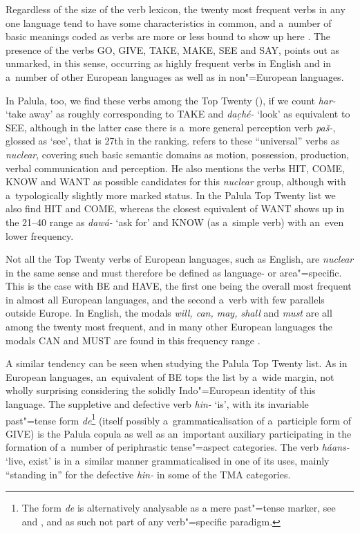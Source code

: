 Regardless of the size of the verb lexicon, the twenty most frequent verbs in any one language tend to have some characteristics in common, and a~number of basic meanings coded as verbs are more or less bound to show up here \citep[209]{viberg2006}. The presence of the verbs GO, GIVE, TAKE, MAKE, SEE and SAY, \citet[247]{viberg1993} points out as unmarked, in this sense, occurring as highly frequent verbs in English and in a~number of other European languages as well as in non"=European languages. 



In Palula, too, we find these verbs among the Top Twenty (), if we count \textit{har-} `take away' as roughly corresponding to TAKE and \textit{dac̣hé-} `look' as equivalent to SEE, although in the latter case there is a~more general perception verb \textit{paš-}, glossed as `see', that is 27th in the ranking. \citet[409]{viberg2006} refers to these ``universal'' verbs as \textit{nuclear}, covering such basic semantic domains as motion, possession, production, verbal communication and perception. He also mentions the verbs HIT, COME, KNOW and WANT as possible candidates for this \textit{nuclear} group, although with a~typologically slightly more marked status. In the Palula Top Twenty list we also find HIT and COME, whereas the closest equivalent of WANT shows up in the 21--40 range as \textit{dawá-} `ask for' and KNOW (as a~simple verb) with an~even lower frequency.



Not all the Top Twenty verbs of European languages, such as English, are \textit{nuclear} in the same sense and must therefore be defined as language- or area"=specific. This is the case with BE and HAVE, the first one being the overall most frequent in almost all European languages, and the second a~verb with few parallels outside Europe. In English, the modals \textit{will, can, may, shall} and \textit{must} are all among the twenty most frequent, and in many other European languages the modals CAN and MUST are found in this frequency range \citep[346--349]{viberg1993}. 



A similar tendency can be seen when studying the Palula Top Twenty list. As in European languages,
an~equivalent of BE tops the list by a~wide margin, not wholly surprising considering the solidly
Indo"=European identity of this language. The suppletive and defective verb \textit{hin-} `is', with its invariable past"=tense form \textit{de}\footnote{The form \textit{de} is alternatively analysable as a mere past"=tense marker, see  and , and as such not part of any verb"=specific paradigm.} (itself possibly a~grammaticalisation of a~participle form of GIVE) is the Palula copula as well as an~important auxiliary participating in the formation of a~number of periphrastic tense"=aspect categories. The verb \textit{háans-} `live, exist' is in a~similar manner grammaticalised in one of its uses, mainly ``standing in'' for the defective \textit{hin-} in some of the TMA categories.


